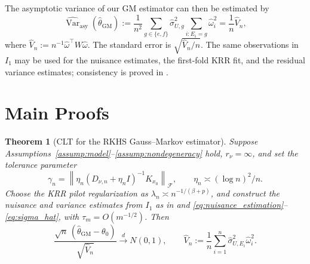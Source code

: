 \documentclass[11pt]{article}
\newtheorem{theorem}{Theorem}[section]
\newcommand{\F}{\mathcal{F}}
\newcommand{\norm}[1]{\left\lVert #1\right\rVert}
\begin{document}
The asymptotic variance of our GM estimator can then be estimated by
\begin{equation}
 \widehat{\operatorname{Var}}_{\mathrm{asy}}(\widehat\theta_{\mathrm{GM}})
 :=\frac1{n^2}\sum_{g\in\{e,f\}}\widehat\sigma_{U,g}^2
     \sum_{i:E_i=g}\widehat\omega_i^2
 =\frac1n\widehat V_n,
 \label{eq:implemented_variance}
\end{equation}
where $\widehat V_n:=n^{-1}\widehat\omega^\top W\widehat\omega$. The standard error is $\sqrt{\widehat V_n/n}$. The same observations in $I_1$ may be used for the nuisance estimates, the first-fold KRR fit, and the residual variance estimates; consistency is proved in .

\clearpage
\newpage
\section{Main Proofs}

\begin{theorem}[CLT for the RKHS Gauss--Markov estimator]\label{thm:clt}
Suppose Assumptions~\ref{assump:model}--\ref{assump:nondegeneracy} hold, $r_\nu=\infty$, and set the tolerance parameter
\[
 \gamma_n=\norm{\eta_n(D_{\nu,n}+\eta_n I)^{-1}K_{x_0}}_{\F},
 \qquad \eta_n\asymp(\log n)^2/n.
\]
Choose the KRR pilot regularization as $\lambda_n\asymp n^{-1/(\beta+p)}$, and construct the nuisance and variance estimates from $I_1$ as in  and \eqref{eq:nuisance_estimation}--\eqref{eq:sigma_hat}, with $\tau_m=O(m^{-1/2})$. Then
\begin{equation}
 \frac{\sqrt n\,(\widehat\theta_{\mathrm{GM}}-\theta_0)}{\sqrt{\widehat V_n}}
 \overset d\longrightarrow N(0,1),
 \qquad \widehat V_n:=\frac1n\sum_{i=1}^n\widehat\sigma_{U,E_i}^2\widehat\omega_i^2.
 \label{eq:clt}
\end{equation}
\end{theorem}
\end{document}
